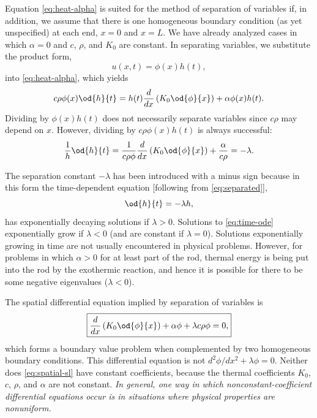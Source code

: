 Equation \eqref{eq:heat-alpha} is suited for the method of separation of variables if, in addition, we assume that there is one homogeneous boundary condition (as yet unspecified) at each end, $x = 0$ and $x = L$.  We have already analyzed cases in which $\alpha = 0$ and $c$, $\rho$, and $K_0$ are constant.  In separating variables, we substitute the product form,
\begin{equation}
\label{eq:product-form}
u(x,t) = \phi(x)h(t),
\end{equation}
into \eqref{eq:heat-alpha}, which yields
\[
c\rho\phi(x)\od{h}{t} = h(t)\frac{d}{d x}\left(K_0\od{\phi}{x}\right) + \alpha\phi(x)h(t).
\]
Dividing by $\phi(x)h(t)$ does not necessarily separate variables since $c\rho$ may depend on $x$.  However, dividing by $c\rho\phi(x)h(t)$ is always successful:
\begin{equation}
\label{eq:separated}
\frac{1}{h}\od{h}{t} = \frac{1}{c\rho\phi}\frac{d}{d x}\left(K_0\od{\phi}{x}\right) + \frac{\alpha}{c\rho} = -\lambda.
\end{equation}

The separation constant $-\lambda$ has been introduced with a minus sign because in this form the time-dependent equation [following from \eqref{eq:separated}],
\begin{equation}
\label{eq:time-ode}
\od{h}{t} = -\lambda h,
\end{equation}
has exponentially decaying solutions if $\lambda > 0$.  Solutions to \eqref{eq:time-ode} exponentially grow if $\lambda < 0$ (and are constant if $\lambda = 0$).  Solutions exponentially growing in time are not usually encountered in physical problems.  However, for problems in which $\alpha > 0$ for at least part of the rod, thermal energy is being put into the rod by the exothermic reaction, and hence it is possible for there to be some negative eigenvalues ($\lambda < 0$).

The spatial differential equation implied by separation of variables is
\begin{equation}
\label{eq:spatial-sl}
\boxed{\frac{d}{d x}\left(K_0\od{\phi}{x}\right) + \alpha\phi + \lambda c\rho\phi = 0,}
\end{equation}
which forms a boundary value problem when complemented by two homogeneous boundary conditions.  This differential equation is not $d^2\phi/dx^2 + \lambda\phi = 0$.  Neither does \eqref{eq:spatial-sl} have constant coefficients, because the thermal coefficients $K_0$, $c$, $\rho$, and $\alpha$ are not constant.  \textit{In general, one way in which nonconstant-coefficient differential equations occur is in situations where physical properties are nonuniform.}

